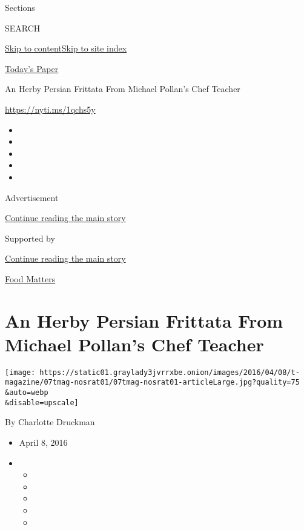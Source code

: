 Sections

SEARCH

\protect\hyperlink{site-content}{Skip to
content}\protect\hyperlink{site-index}{Skip to site index}

\href{https://myaccount.nytimes3xbfgragh.onion/auth/login?response_type=cookie\&client_id=vi}{}

\href{https://www.nytimes3xbfgragh.onion/section/todayspaper}{Today's
Paper}

An Herby Persian Frittata From Michael Pollan's Chef Teacher

\url{https://nyti.ms/1qchs5y}

\begin{itemize}
\item
\item
\item
\item
\item
\end{itemize}

Advertisement

\protect\hyperlink{after-top}{Continue reading the main story}

Supported by

\protect\hyperlink{after-sponsor}{Continue reading the main story}

\href{/column/food-matters}{Food Matters}

\hypertarget{an-herby-persian-frittata-from-michael-pollans-chef-teacher}{%
\section{An Herby Persian Frittata From Michael Pollan's Chef
Teacher}\label{an-herby-persian-frittata-from-michael-pollans-chef-teacher}}

\texttt{[image: https://static01.graylady3jvrrxbe.onion/images/2016/04/08/t-magazine/07tmag-nosrat01/07tmag-nosrat01-articleLarge.jpg?quality=75\\\&auto=webp\\\&disable=upscale]}

By Charlotte Druckman

\begin{itemize}
\item
  April 8, 2016
\item
  \begin{itemize}
  \item
  \item
  \item
  \item
  \item
  \end{itemize}
\end{itemize}

